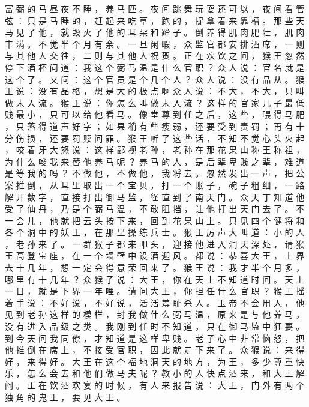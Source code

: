 {富 弼 的 马 昼 夜 不 睡 ， 养 马 匹 。
夜 间 跳 舞 玩 耍 还 可 以 ， 夜 间 看 管 弦 ： 只 是 马 睡 的 ， 赶 起 来 吃 草 ， 跑 的 ， 捉 拿 着 来 靠 槽 。
那 些 天 马 见 了 他 ， 就 毁 灭 了 他 的 耳 朵 和 蹄 子 。
倒 养 得 肌 肉 肥 壮 ， 肌 肉 丰 满 。
不 觉 半 个 月 有 余 。
一 旦 闲 暇 ， 众 监 官 都 安 排 酒 席 ， 一 则 与 其 他 人 交 往 ， 二 则 与 其 他 人 祝 贺 。
正 在 欢 饮 之 间 ， 猴 王 忽 然 停 下 酒 杯 问 道 ： 我 这 个 弼 马 温 是 什 么 官 职 ？ 众 人 说 ： 官 名 就 是 这 个 了 。
又 问 ： 这 个 官 员 是 个 几 个 人 ？ 众 人 说 ： 没 有 品 从 。
猴 王 说 ： 没 有 品 格 ， 想 是 大 的 极 点 啊 众 人 说 ： 不 大 ， 不 大 ， 只 叫 做 未 入 流 。
猴 王 说 ： 你 怎 么 叫 做 未 入 流 ？
这 样 的 官 家 儿 子 最 低 贱 最 小 ， 只 可 以 给 他 看 马 。
像 堂 尊 到 任 之 后 ， 这 些 ， 喂 得 马 肥 ， 只 落 得 道 声 好 字 ； 如 果 稍 有 些 瘦 弱 ， 还 要 受 到 责 罚 ； 再 有 十 分 伤 损 ， 还 要 罚 赎 问 罪 。
猴 王 听 了 这 些 话 ， 不 知 不 觉 心 头 火 起 ， 咬 着 牙 大 怒 说 ： 这 样 鄙 视 老 孙 ， 老 孙 在 那 花 果 山 称 王 称 祖 ， 为 什 么 唆 我 来 替 他 养 马 呢 ？ 养 马 的 人 ， 是 后 辈 卑 贱 之 辈 ， 难 道 是 等 我 的 吗 ？ 不 做 他 ， 不 做 他 ， 我 将 去 。
忽 然 发 出 一 声 ， 把 公 案 推 倒 ， 从 耳 里 取 出 一 个 宝 贝 ， 打 一 个 账 子 ， 碗 子 粗 细 ， 一 路 解 开 数 字 ， 直 接 打 出 御 马 监 ， 径 直 到 了 南 天 门 。
众 天 丁 知 道 他 受 了 仙 丹 ， 乃 是 个 弼 马 温 ， 不 敢 阻 挡 ， 让 他 打 出 天 门 去 了 。
不 一 会 儿 ， 他 就 把 云 头 按 下 来 ， 回 到 花 果 山 上 。
只 见 四 个 健 将 和 各 个 洞 中 的 妖 王 ， 在 那 里 操 练 兵 士 。
猴 王 厉 声 大 叫 道 ： 小 的 人 ， 老 孙 来 了 。
一 群 猴 子 都 来 叩 头 ， 迎 接 他 进 入 洞 天 深 处 ， 请 猴 王 高 登 宝 座 ， 在 一 个 墙 壁 中 设 酒 迎 风 。
都 说 ： 恭 喜 大 王 ， 上 界 去 十 几 年 ， 想 一 定 会 得 意 荣 回 来 了 。 猴 王 说 ： 我 才 半 个 月 多 ， 哪 里 有 十 几 年 ？ 众 猴 子 说 ： 大 王 ， 你 在 天 上 不 知 道 时 间 。
天 上 一 日 ， 就 是 下 界 一 年 哩 。
请 问 大 王 ， 你 担 任 什 么 官 职 ？ 猴 王 摇 着 手 说 ： 不 好 说 ， 不 好 说 ， 活 活 羞 耻 杀 人 。
玉 帝 不 会 用 人 ， 他 见 到 老 孙 这 样 的 模 样 ， 封 我 做 什 么 弼 马 温 ， 原 来 是 与 他 养 马 ， 没 有 进 入 品 级 之 类 。
我 刚 到 任 时 不 知 道 ， 只 在 御 马 监 中 狂 耍 。
到 今 天 问 我 同 僚 ， 才 知 道 是 这 样 卑 贱 。
老 子 心 中 非 常 恼 怒 ， 把 他 推 倒 在 席 上 ， 不 接 受 官 职 ， 因 此 就 走 下 来 了 。
众 猴 说 ： 来 得 好 ， 来 得 好 。
大 王 在 这 个 福 地 洞 天 的 地 方 ， 为 王 ， 多 少 尊 重 快 乐 ， 怎 么 会 去 和 他 们 做 马 夫 呢 ？ 教 小 的 人 快 点 酒 来 ， 和 大 王 解 闷 。
正 在 饮 酒 欢 宴 的 时 候 ， 有 人 来 报 告 说 ： 大 王 ， 门 外 有 两 个 独 角 的 鬼 王 ， 要 见 大 王 。
}
